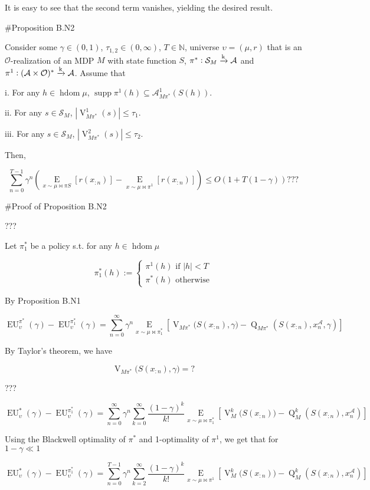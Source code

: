 \documentclass[a4paper]{article}
\DeclareMathOperator{\Supp}{supp}
\newcommand{\AP}[1]{\left(#1\right)}
\newcommand{\AB}[1]{\left[#1\right]}
\newcommand{\E}[1]{\underset{#1}{\operatorname{E}}}
\newcommand{\Ea}[2]{\underset{#1}{\operatorname{E}}\AB{#2}}
\newcommand{\Nats}{\mathbb{N}}
\newcommand{\Abs}[1]{\left\vert #1 \right\vert}
\newcommand{\M}{\xrightarrow{\textnormal{k}}}
\newcommand{\Ob}{\mathcal{O}}
\newcommand{\A}{\mathcal{A}}
\newcommand{\St}{\mathcal{S}}
\newcommand{\FH}{(\A \times \Ob)^*}
\DeclareMathOperator{\HD}{hdom}
\newcommand{\V}{\operatorname{V}}
\newcommand{\Q}{\operatorname{Q}}
\newcommand{\EU}{\operatorname{EU}}
\begin{document}
It is easy to see that the second term vanishes, yielding the desired result.

\#Proposition B.N2

Consider some $\gamma\in(0,1)$, $\tau_{1,2}\in(0,\infty)$, $T \in \Nats$, universe $\upsilon=(\mu,r)$ that is an $\Ob$-realization of an MDP $M$ with state function $S$, $\pi^*: \St_M \M \A$ and $\pi^1: \FH \M \A$. Assume that

i. For any $h \in \HD{\mu}$, $\Supp{\pi^1(h)} \subseteq \A_{M\pi^*}^1\AP{S(h)}$. 

ii. For any $s \in \St_M$, $\Abs{\V_{M\pi^*}^1(s)} \leq \tau_1$.

iii. For any $s \in \St_M$, $\Abs{\V_{M\pi^*}^2(s)} \leq \tau_2$.

Then,

$$\sum_{n=0}^{T-1} \gamma^n \left(\E{x \sim \mu\bowtie\pi S}\left[r\left(x_{:n}\right)\right]-\E{x \sim \mu\bowtie\pi^1}\left[r\left(x_{:n}\right)\right]\right) \leq O\left(1 + T\left(1-\gamma\right)\right)???$$

\#Proof of Proposition B.N2

???

Let $\pi^*_1$ be a policy s.t. for any $h \in \HD{\mu}$

$$\pi^*_1(h):=\begin{cases} \pi^1(h) \text{ if } \Abs{h} < T \\ \pi^*(h) \text{ otherwise} \end{cases}$$

By Proposition B.N1

$$\EU_{\upsilon}^{\pi^*}(\gamma) - \EU_{\upsilon}^{\pi^*_1}(\gamma) = \sum_{n=0}^\infty{\gamma^n \Ea{x\sim\mu\bowtie\pi^*_1}{\V_{M\pi^*}\Big(S\AP{x_{:n}},\gamma\Big)-\Q_{M\pi^*}\AP{S\AP{x_{:n}},x_n^\A,\gamma}}}$$

By Taylor's theorem, we have

$$\V_{M\pi^*}\Big(S\AP{x_{:n}},\gamma\Big) = ?$$

???

$$\EU_{\upsilon}^{*}(\gamma) - \EU_{\upsilon}^{\pi^*_1}(\gamma) = \sum_{n=0}^\infty{\gamma^n \sum_{k=0}^\infty{\frac{(1-\gamma)^k}{k!} \Ea{x\sim\mu\bowtie\pi^*_1}{\V_M^k\Big(S\AP{x_{:n}}\Big)-\Q_M^k\AP{S\AP{x_{:n}},x_n^\A}}}}$$

Using the Blackwell optimality of $\pi^*$ and 1-optimality of $\pi^1$, we get that for $1-\gamma \ll 1$

$$\EU_{\upsilon}^{*}(\gamma) - \EU_{\upsilon}^{\pi^*_1}(\gamma) = \sum_{n=0}^{T-1}{\gamma^n \sum_{k=2}^\infty{\frac{(1-\gamma)^k}{k!} \Ea{x\sim\mu\bowtie\pi^1}{\V_M^k\Big(S\AP{x_{:n}}\Big)-\Q_M^k\AP{S\AP{x_{:n}},x_n^\A}}}}$$
\end{document}
